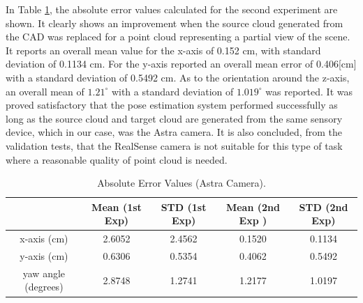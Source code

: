 In Table \ref{absolute}, the absolute error values calculated for the second experiment are shown. It clearly shows an improvement when the source cloud generated from the CAD was replaced for a point cloud representing a partial view of the scene. It reports an overall mean value for the x-axis of 0.152 cm,  with standard deviation of 0.1134 cm. For the y-axis reported an overall mean error of 0.406[cm] with a standard deviation of 0.5492 cm. As to the orientation around the z-axis, an overall mean of $1.21^{\circ}$ with a standard deviation of $1.019^{\circ}$ was reported. It was proved satisfactory that the pose estimation system performed successfully as long as the source cloud and target cloud are generated from the same sensory device, which in our case, was the Astra camera. It is also concluded, from the validation tests, that the RealSense camera is not suitable for this type of task where a reasonable quality of point cloud is needed.  


\begin{table}[ht]
\renewcommand{\arraystretch}{1.3}
\caption{Absolute Error Values (Astra Camera).}
\label{absolute}
\centering
\begin{tabular}{|c||c||c||c||c|}
\hline
  & Mean (1st Exp)& STD (1st Exp) &  Mean (2nd Exp )& STD (2nd Exp) \\
\hline
x-axis (cm) & 2.6052 & 2.4562 & 0.1520 & 0.1134\\
\hline
y-axis (cm) & 0.6306 & 0.5354 & 0.4062 & 0.5492\\
\hline
yaw angle (degrees)& 2.8748 & 1.2741 & 1.2177 & 1.0197\\
\hline
\hline
\end{tabular}
\end{table}


